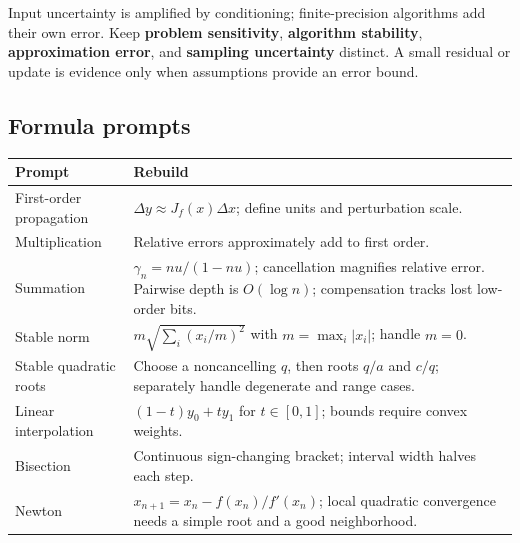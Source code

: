 \hypertarget{appendix-cb5af353ef77-the-chain}{}

Input uncertainty is amplified by conditioning; finite-precision algorithms add their own error. Keep \textbf{problem sensitivity}, \textbf{algorithm stability}, \textbf{approximation error}, and \textbf{sampling uncertainty} distinct. A small residual or update is evidence only when assumptions provide an error bound.

\subsection{Formula prompts}\label{appendix-cb5af353ef77-formula-prompts-1}

\hypertarget{appendix-cb5af353ef77-formula-prompts-1}{}

{\def\LTcaptype{none} %
\begin{longtable}[]{@{}
  >{\raggedright\arraybackslash}p{}
  >{\raggedright\arraybackslash}p{}@{}}
\toprule\noalign{}
\begin{minipage}[b]{\linewidth}\raggedright
Prompt
\end{minipage} & \begin{minipage}[b]{\linewidth}\raggedright
Rebuild
\end{minipage} \\
\midrule\noalign{}
\endhead
\bottomrule\noalign{}
\endlastfoot
First-order propagation & \(\Delta y\approx J_f(x)\Delta x\); define units and perturbation scale. \\
Multiplication & Relative errors approximately add to first order. \\
Summation & \(\gamma_n=nu/(1-nu)\); cancellation magnifies relative error. Pairwise depth is \(O(\log n)\); compensation tracks lost low-order bits. \\
Stable norm & \(m\sqrt{\sum_i(x_i/m)^2}\) with \(m=\max_i|x_i|\); handle \(m=0\). \\
Stable quadratic roots & Choose a noncancelling \(q\), then roots \(q/a\) and \(c/q\); separately handle degenerate and range cases. \\
Linear interpolation & \((1-t)y_0+ty_1\) for \(t\in[0,1]\); bounds require convex weights. \\
Bisection & Continuous sign-changing bracket; interval width halves each step. \\
Newton & \(x_{n+1}=x_n-f(x_n)/f'(x_n)\); local quadratic convergence needs a simple root and a good neighborhood. \\

\end{longtable}}
